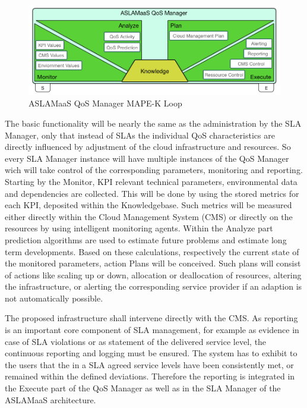 \begin{figure}[!ht]
\centering
\includegraphics[width=5.3in]{chapters/chapter4/fig/QoSMan.PNG}
\caption{ASLAMaaS QoS Manager MAPE-K Loop }
\label{fig_QoSManager}
\end{figure}

The basic functionality will be nearly the same as the administration by the SLA Manager, only that instead of SLAs the individual QoS characteristics are directly influenced by adjustment of the cloud infrastructure and resources. So every SLA Manager instance will have multiple instances of the QoS Manager wich will take control of the corresponding parameters, monitoring and reporting. Starting by the Monitor, KPI relevant technical parameters, environmental data and dependencies are collected. This will be done by using the stored metrics for each KPI, deposited within the Knowledgebase. Such metrics will be measured either directly within the Cloud Management System (CMS) or directly on the resources by using intelligent monitoring agents. Within the Analyze part prediction algorithms are used to estimate future problems and estimate long term developments. Based on these calculations, respectively the current state of the monitored parameters,  action Plans will be conceived. Such plans will consist of actions like scaling up or down, allocation or deallocation of resources, altering the infrastructure, or alerting the corresponding service provider if an adaption is not automatically possible. 

The proposed infrastructure shall intervene directly with the CMS. As reporting is an important core component of SLA management, for example as evidence in case of SLA violations or as statement of the delivered service level, the continuous reporting and logging must be ensured. The system has to exhibit to the users that the in a SLA agreed service levels have been consistently met, or remained within the defined deviations. Therefore the reporting is integrated in the Execute part of the QoS Manager as well as in the SLA Manager of the ASLAMaaS architecture.

